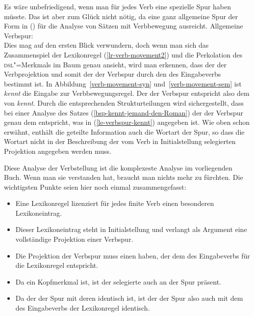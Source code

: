 Es wäre unbefriedigend, wenn man für jedes Verb eine spezielle Spur haben müsste. Das ist aber 
zum Glück nicht nötig, da eine ganz allgemeine Spur der Form in () für die Analyse
von Sätzen mit Verbbewegung ausreicht.
\eas
\label{le-verbspur}%
Allgemeine Verbspur:\\
\zs
Dies mag auf den ersten Blick verwundern, doch wenn man sich das Zusammenspiel der Lexikonregel
(\ref{lr-verb-movement2}) und die Perkolation des \textsc{dsl}"=Merkmals im Baum genau ansieht, wird
man erkennen, dass der \dslw der Verbprojektion und somit der \localw der Verbspur durch den
\localw des Eingabeverbs bestimmt ist. In Abbildung~\ref{verb-movement-syn} und~\ref{verb-movement-sem}
ist \emph{kennt} die Eingabe zur Verbbewegungsregel. Der \localw der Verbspur entspricht
also dem \localw von \emph{kennt}. Durch die entsprechenden Strukturteilungen wird  sichergestellt,
dass bei einer Analyse des Satzes (\ref{bsp-kennt-jemand-den-Roman}) der \localw der Verbspur genau dem entspricht, was in
(\ref{le-verbspur-kennt}) angegeben ist. Wie oben schon erwähnt, enthält die geteilte Information
auch die Wortart der Spur, so dass die Wortart nicht in der Beschreibung der vom Verb in
Initialstellung selegierten Projektion angegeben werden muss.

Diese Analyse der Verbstellung ist die komplexeste Analyse im vorliegenden Buch. Wenn man sie verstanden
hat, braucht man nichts mehr zu fürchten. Die wichtigsten Punkte seien hier noch einmal zusammengefasst:
\begin{itemize}
\item Eine Lexikonregel lizenziert für jedes finite Verb einen besonderen Lexikoneintrag.
\item Dieser Lexikoneintrag steht in Initialstellung und verlangt als Argument eine vollständige Projektion
      einer Verbspur.
\item Die Projektion der Verbspur muss einen \dslw haben, der dem \localw des Eingabeverbs für die Lexikonregel
      entspricht.
\item Da \dsl ein Kopfmerkmal ist, ist der selegierte \dslw auch an der Spur präsent.
\item Da der \dslw der Spur mit deren \localw identisch ist, ist der \localw der Spur also
      auch mit dem \localw des Eingabeverbs der Lexikonregel identisch.
\end{itemize}

